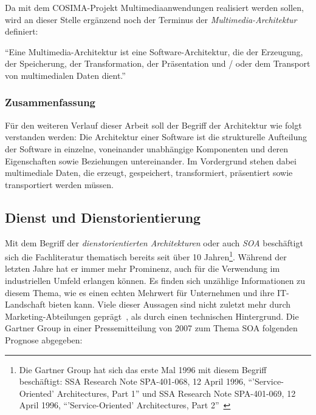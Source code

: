   Da mit dem COSIMA-Projekt Multimediaanwendungen realisiert werden sollen, wird an dieser Stelle ergänzend noch der Terminus der \emph{Multimedia-Architektur} definiert:
  
  \begin{definition}\label{def:multimedia_architektur}
    "`Eine Multimedia-Architektur ist eine Software-Architektur, die der Erzeugung, der Speicherung, der Transformation, der Präsentation und / oder dem Transport von multimedialen Daten dient."'~\emph{\citep[S. 423]{handbuch_der_software_architektur}}
  \end{definition}


\subsubsection{Zusammenfassung} %
\label{ssub:zusammenfassung}

  Für den weiteren Verlauf dieser Arbeit soll der Begriff der Architektur wie folgt verstanden werden: Die Architektur einer Software ist die strukturelle Aufteilung der Software in einzelne, voneinander unabhängige Komponenten und deren Eigenschaften sowie Beziehungen untereinander. Im Vordergrund stehen dabei multimediale Daten, die erzeugt, gespeichert, transformiert, präsentiert sowie transportiert werden müssen.



\subsection{Dienst und Dienstorientierung} %
\label{sub:definition_dienst_und_dienstorientierung}

  Mit dem Begriff der \emph{dienstorientierten Architekturen} oder auch \emph{SOA} beschäftigt sich die Fachliteratur thematisch bereits seit über 10 Jahren\footnote{Die Gartner Group hat sich das erste Mal 1996 mit diesem Begriff beschäftigt: SSA Research Note SPA-401-068, 12 April 1996, "`'Service-Oriented' Architectures, Part 1"' und SSA Research Note SPA-401-069, 12 April 1996, "`'Service-Oriented' Architectures, Part 2"'~\citep{natis2003soa}}. Während der letzten Jahre hat er immer mehr Prominenz, auch für die Verwendung im industriellen Umfeld erlangen können. Es finden sich unzählige Informationen zu diesem Thema, wie es einen echten Mehrwert für Unternehmen und ihre IT-Landschaft bieten kann. Viele dieser Aussagen sind nicht zuletzt mehr durch Marketing-Abteilungen geprägt~\citep{soa_goes_real}, als durch einen technischen Hintergrund. Die Gartner Group in einer Pressemitteilung von 2007 zum Thema SOA folgenden Prognose abgegeben:
  
